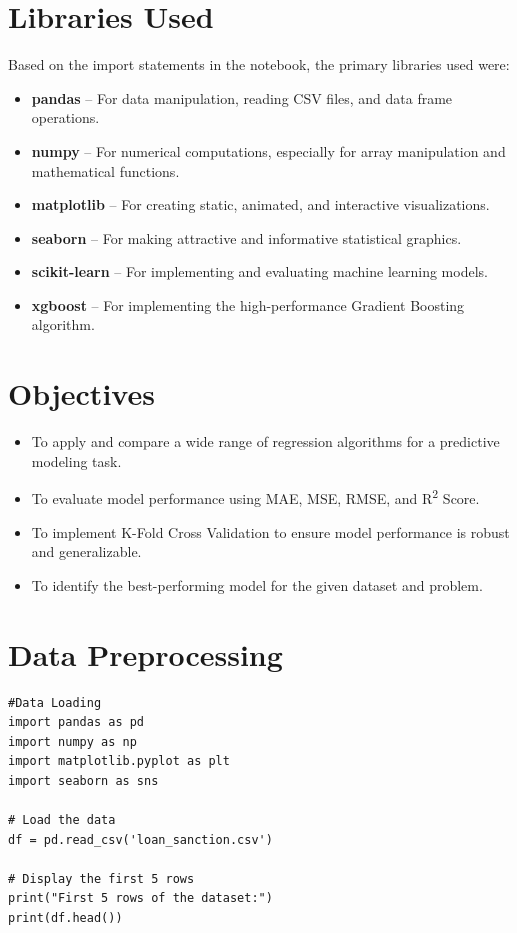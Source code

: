 \documentclass[12pt]{article}
\begin{document}
\section{Libraries Used}
Based on the import statements in the notebook, the primary libraries used were:
\begin{itemize}
    \item \textbf{pandas} – For data manipulation, reading CSV files, and data frame operations.
    \item \textbf{numpy} – For numerical computations, especially for array manipulation and mathematical functions.
    \item \textbf{matplotlib} – For creating static, animated, and interactive visualizations.
    \item \textbf{seaborn} – For making attractive and informative statistical graphics.
    \item \textbf{scikit-learn} – For implementing and evaluating machine learning models.
    \item \textbf{xgboost} – For implementing the high-performance Gradient Boosting algorithm.
\end{itemize}

\section{Objectives}
\begin{itemize}
    \item To apply and compare a wide range of regression algorithms for a predictive modeling task.
    \item To evaluate model performance using MAE, MSE, RMSE, and R\textsuperscript{2} Score.
    \item To implement K-Fold Cross Validation to ensure model performance is robust and generalizable.
    \item To identify the best-performing model for the given dataset and problem.
\end{itemize}


\section{Data Preprocessing}
\begin{verbatim}  
#Data Loading
import pandas as pd
import numpy as np
import matplotlib.pyplot as plt
import seaborn as sns

# Load the data
df = pd.read_csv('loan_sanction.csv')

# Display the first 5 rows
print("First 5 rows of the dataset:")
print(df.head())
\end{verbatim}
\end{document}
